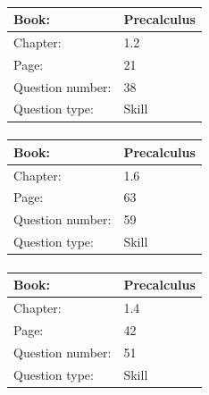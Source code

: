 \documentclass{article}
\begin{document}
            \paragraph{}
            \begin{tabularx}{1\textwidth}{
                    p{}
                    p{}
                }
                \toprule
                Book: & Precalculus
                \\
                \midrule
                Chapter: & 1.2
                \\
                \midrule
                Page: & 21
                \\
                \midrule
                Question number: & 38
                \\
                \midrule
                Question type: & Skill
                \\
                \bottomrule
            \end{tabularx}
            
            \paragraph{}
            \begin{tabularx}{1\textwidth}{
                    p{}
                    p{}
                }
                \toprule
                Book: & Precalculus
                \\
                \midrule
                Chapter: & 1.6
                \\
                \midrule
                Page: & 63
                \\
                \midrule
                Question number: & 59
                \\
                \midrule
                Question type: & Skill
                \\
                \bottomrule
            \end{tabularx}
            
            \paragraph{}
            \begin{tabularx}{1\textwidth}{
                    p{}
                    p{}
                }
                \toprule
                Book: & Precalculus
                \\
                \midrule
                Chapter: & 1.4
                \\
                \midrule
                Page: & 42
                \\
                \midrule
                Question number: & 51
                \\
                \midrule
                Question type: & Skill
                \\
                \bottomrule
            \end{tabularx}
            
\end{document}
